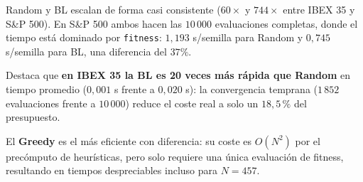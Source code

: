 \documentclass[12pt,a4paper]{article}
\begin{document}
Random y BL escalan de forma casi consistente ($60\times$ y $744\times$ entre IBEX 35 y S\&P 500).
En S\&P 500 ambos hacen las $10\,000$ evaluaciones completas,
donde el tiempo está dominado por \texttt{fitness}: $1{,}193$ s/semilla para Random
y $0{,}745$ s/semilla para BL, una diferencia del $37\%$.

Destaca que \textbf{en IBEX 35 la BL es 20 veces más rápida que Random}
en tiempo promedio ($0{,}001$ s frente a $0{,}020$ s):
la convergencia temprana ($1\,852$ evaluaciones frente a $10\,000$)
reduce el coste real a solo un $18{,}5\,\%$ del presupuesto.

El \textbf{Greedy} es el más eficiente con diferencia: su coste es $O(N^2)$
por el precómputo de heurísticas, pero solo requiere una única
evaluación de fitness, resultando en tiempos despreciables incluso para
$N=457$.

\end{document}
